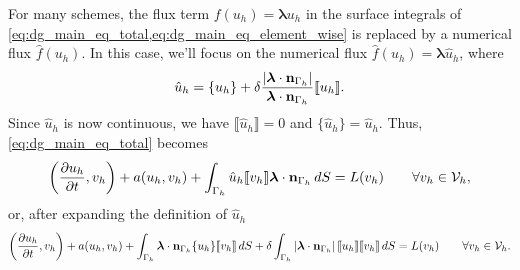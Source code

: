 \documentclass[oneside,a4paper,11pt]{report}
\begin{document}
For many schemes, the flux term $f(u_h) = \boldsymbol{\lambda} u_h$ in the surface integrals of \cref{eq:dg_main_eq_total,eq:dg_main_eq_element_wise} is replaced by a numerical flux $\hat{f}(u_h)$. In this case, we'll focus on the numerical flux $\hat{f}(u_h) = \boldsymbol{\lambda} \hat{u}_h$, where 
\begin{equation}
    \label{eq:dg_numerical_flux}
    \hat{u}_h = \{ u_h \} + \delta \frac{\left | \boldsymbol{\lambda} \cdot \mathbf{n}_{\Gamma_h} \right |}{\boldsymbol{\lambda} \cdot \mathbf{n}_{\Gamma_h}} \llbracket u_h \rrbracket.
\end{equation}
Since $\hat{u}_h$ is now continuous, we have $\llbracket \hat{u}_h \rrbracket = 0$ and $\{ \hat{u}_h \} = \hat{u}_h$. Thus, \cref{eq:dg_main_eq_total} becomes
\begin{equation}
    \left ( \frac{\partial u_h}{\partial t} , v_h \right ) + a(u_h,v_h)  + \int_{\Gamma_h} \hat{u}_h \llbracket v_h \rrbracket \bm \lambda \cdot \mathbf{n}_{\Gamma_h} \, dS = L(v_h) \qquad \forall v_h \in \mathcal{V}_h,
\end{equation}
or, after expanding the definition of $\hat{u}_h$
\begin{equation}
    \label{eq:dg_main_eq_total_with_upwinding_weak}
    \left ( \frac{\partial u_h}{\partial t} , v_h \right ) + a(u_h,v_h)  + \int_{\Gamma_h} \bm \lambda \cdot \mathbf{n}_{\Gamma_h} \{ u_h \} \llbracket v_h \rrbracket \, dS + \delta \int_{\Gamma_h} \left | \boldsymbol{\lambda} \cdot \mathbf{n}_{\Gamma_h} \right | \llbracket u_h \rrbracket \llbracket v_h \rrbracket \, dS = L(v_h) \qquad \forall v_h \in \mathcal{V}_h.
\end{equation}
\end{document}
